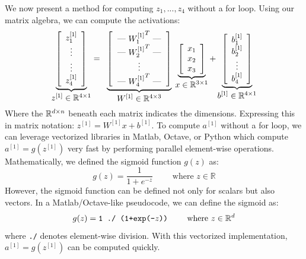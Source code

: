 \documentclass{article}
\numberwithin{equation}{section}
\begin{document}
We now present a method for computing $z_1,...,z_4$ without a for loop. Using our matrix algebra, we can compute the activations:
\begin{equation}\label{eq:z1}
\underbrace{
\left[\begin{array}{c}
z^{[1]}_1 \\
\vdots \\
\vdots \\
z^{[1]}_4
\end{array} \right]}_{\mbox{\normalsize $z^{[1]} \in \mathbb{R}^{4\times 1}$}}
= \;\;
\underbrace{
\left[ \begin{tabular}{c}
--- ${W^{[1]}_1}^T$ --- \\
--- ${W^{[1]}_2}^T$ --- \\
\vdots \\ 
--- ${W^{[1]}_4}^T$ --- 
\end{tabular}\right]}_{\mbox{\normalsize $W^{[1]} \in \mathbb{R}^{4\times 3}$}}
\;
\underbrace{
\left[\begin{array}{c}
x_1 \\
x_2 \\
x_3
\end{array}
\right]}_{\mbox{\normalsize $x \in \mathbb{R}^{3\times 1}$}} + 
\underbrace{
\left[\begin{array}{c}
b^{[1]}_1 \\
b^{[1]}_2 \\
\vdots \\
b^{[1]}_4
\end{array} \right]
}_{\mbox{\normalsize $b^{[1]} \in \mathbb{R}^{4\times 1}$}}
\end{equation}
Where the $\mathbb{R}^{{d} \times {n}}$ beneath each matrix indicates the dimensions. Expressing this in matrix  notation: $z^{[1]} = W^{[1]} x + b^{[1]}$. To compute $a^{[1]}$ without a for loop, we can leverage vectorized libraries in Matlab, Octave, or Python which compute $a^{[1]} = g(z^{[1]})$ very fast by performing parallel element-wise operations. Mathematically, we defined the sigmoid function $g(z)$ as:
\begin{equation}
g(z) = \frac{1}{1+e^{-z}} \qquad \textrm{ where } z \in \mathbb{R}
\end{equation}
\noindent However, the sigmoid function can be defined not only for scalars but also vectors. In a Matlab/Octave-like pseudocode, we can define the sigmoid as:
\begin{equation}
g(z) = \texttt{1 ./ (1+exp(-}z\texttt{))}\qquad \textrm{ where } z \in \mathbb{R}^{d}
\end{equation}
where \texttt{./} denotes element-wise division. With this vectorized implementation, $a^{[1]} = g(z^{[1]})$ can be computed quickly.
\end{document}
